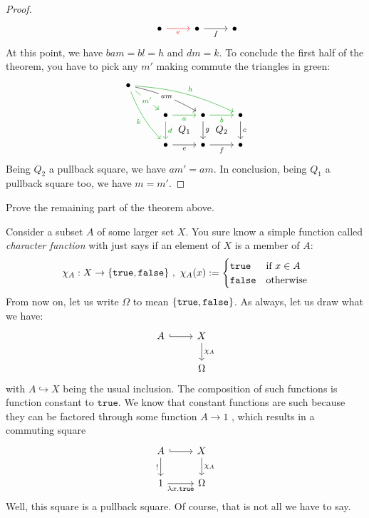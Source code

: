 \begin{proof}
\[\begin{tikzcd}
      & \bullet \ar["e", r, swap, red] & \bullet \ar["f", r, swap] &
      \bullet
    \end{tikzcd}\] At this point, we have \(b a m = b l = h\) and
  \(dm = k\). To conclude the first half of the theorem, you have to
  pick any \(m'\) making commute the triangles in green:
  \[\begin{tikzcd}
      \bullet \ar["h", bend left=10, drrr, green!65!black] \ar["k", bend right=10, ddr, swap, green!65!black] \ar["am" description, drr, bend left=8] \ar["{m'}" description, dr, green!65!black] & & & \\
      & \bullet \ar["a", r, swap, green!65!black] \ar["d", d, green!65!black] \ar["{Q_1}", dr, phantom] & \bullet \ar["b", r, swap, green!65!black] \ar["g", d] \ar["{Q_2}", dr, phantom] & \bullet \ar["c", d]\\
      & \bullet \ar["e", r, swap] & \bullet \ar["f", r, swap] & \bullet
    \end{tikzcd}\] Being \(Q_2\) a pullback square, we have
  \(am' = am\). In conclusion, being \(Q_1\) a pullback square too, we
  have \(m = m'\). 
\end{proof}

\begin{exercise}
  Prove the remaining part of the theorem above.
\end{exercise}

\begin{example}
  Consider a subset \(A\) of some larger set \(X\). You sure know a
  simple function called {\em character function} with just says if an
  element of \(X\) is a member of \(A\):
  \[\chi_A : X \to \left\{\mathtt{true}, \mathtt{false}\right\}\,,\ \chi_A (x)
    := \begin{cases} \mathtt{true} & \text{if } x \in A \\
      \mathtt{false} & \text{otherwise} \end{cases}\] From now on, let
  us write \(\Omega\) to mean \(\left\{\mathtt{true},
  \mathtt{false}\right\}\). As always, let us draw what we have:
\[\begin{tikzcd}
    A \ar[r, hookrightarrow] & X \ar["{\chi_A}", d] \\
    & \Omega
  \end{tikzcd}\] with \(A \hookrightarrow X\) being the usual
inclusion. The composition of such functions is function constant to
\(\mathtt{true}\). We know that constant functions are such because they
can be factored through some function \(A \to 1\) , which results in a commuting square
\[\begin{tikzcd}
    A \ar[r, hookrightarrow] \ar["!", d, swap] & X \ar["{\chi_A}", d] \\
    1 \ar["{\lambda x. \mathtt{true}}", r, swap] & \Omega
  \end{tikzcd}\] Well, this square is a pullback square. Of course, that
is not all we have to say. 
\end{example}

